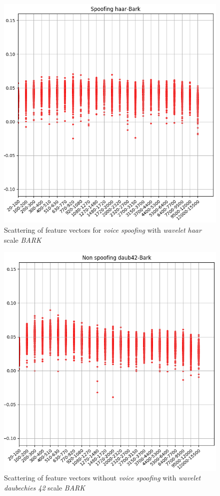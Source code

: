 		\begin{figure}[H]
			\centering
			\includegraphics[scale=.55]{images/results/barkVersusMel/spoofingHaarBark}
			\caption{Scattering of feature vectors for \textit{voice spoofing} with \textit{wavelet haar} scale \textit{BARK}}
			\label{fig:spoofinghaarbark}
		\end{figure}
		
		\begin{figure}[H]
			\centering
			\includegraphics[scale=.55]{images/results/barkVersusMel/liveDaub42Bark}
			\caption{Scattering of feature vectors without \textit{voice spoofing} with \textit{wavelet daubechies 42} scale \textit{BARK}}
			\label{fig:livedaub42bark}
		\end{figure}
		
